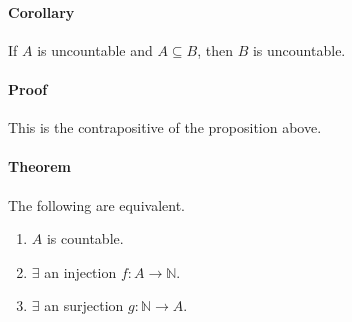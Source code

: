 \documentclass{article}
\newcommand{\mapAb}[2]{\mathbb{#1}\xrightarrow{}{#2}}
\newcommand{\mapaB}[2]{{#1}\xrightarrow{}\mathbb{#2}}
\begin{document}
	\paragraph{Corollary}If $A$ is uncountable and $A\subseteq B$, then $B$ is uncountable.
	\paragraph{Proof} This is the contrapositive of the proposition above.
	\paragraph{Theorem}The following are equivalent.
	\begin{enumerate}[label=(\roman*)]
		\item $A$ is countable.\\
		\item $\exists$ an injection $f:\mapaB{A}{N}$.\\
		\item $\exists$ an surjection $g:\mapAb{N}{A}$.
	\end{enumerate}
\end{document}
